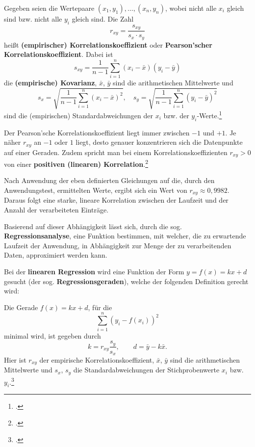 \flqq Gegeben seien die Wertepaare $(x_1,y_1), \dots,(x_n,y_n)$, wobei nicht alle $x_i$ gleich sind bzw. nicht alle $y_i$ gleich sind. Die Zahl
\begin{equation*}
r_{xy} = \frac{s_{xy}}{s_x \cdot s_y}
\end{equation*} 
heißt \textbf{(empirischer) Korrelationskoeffizient} oder \textbf{Pearson'scher Korrelationskoeffizient}. Dabei ist
\begin{equation*}
s_{xy} = \frac{1}{n-1} \displaystyle\sum_{i=1}^{n} (x_i - \bar{x})(y_i - \bar{y})
\end{equation*}
die \textbf{(empirische) Kovarianz}, $\bar{x}$, $\bar{y}$ sind die arithmetischen Mittelwerte und
\begin{equation*}
s_x = \sqrt{\frac{1}{n-1} \displaystyle\sum_{i=1}^{n} (x_i - \bar{x})^2}, \quad s_y = \sqrt{\frac{1}{n-1} \displaystyle\sum_{i=1}^{n} (y_i - \bar{y})^2}
\end{equation*}
sind die (empirischen) Standardabweichungen der $x_i$ bzw. der $y_i$-Werte.\frqq\footcite[S. 213]{Teschl.2014}

Der Pearson'sche Korrelationskoeffizient liegt immer zwischen $-1$ und $+1$. Je näher $r_{xy}$ an $-1$ oder $1$ liegt, desto genauer konzentrieren sich die Datenpunkte auf einer Geraden. Zudem spricht man bei einem Korrelationskoeffizienten $r_{xy}>0$ von einer \textbf{positiven (linearen) Korrelation}.\footcite[Vgl.][S. 214]{Teschl.2014}

Nach Anwendung der eben definierten Gleichungen auf die, durch den Anwendungstest, ermittelten Werte, ergibt sich ein Wert von $r_{xy} \approx 0,9982$. Daraus folgt eine starke, lineare Korrelation zwischen der Laufzeit und der Anzahl der verarbeiteten Einträge.

Basierend auf dieser Abhängigkeit lässt sich, durch die sog. \textbf{Regressionsanalyse}, eine Funktion bestimmen, mit welcher, die zu erwartende Laufzeit der Anwendung, in Abhängigkeit zur Menge der zu verarbeitenden Daten, approximiert werden kann.

Bei der \textbf{linearen Regression} wird eine Funktion der Form $y = f(x) = kx + d$ gesucht (der sog. \textbf{Regressionsgeraden}), welche der folgenden Definition gerecht wird:

\flqq Die Gerade $f(x) = kx + d$, für die
\begin{equation*}
\displaystyle\sum_{i=1}^{n} (y_i - f(x_i))^2
\end{equation*}
minimal wird, ist gegeben durch
\begin{equation*}
k = r_{xy} \frac{s_y}{s_x}, \quad \quad d = \bar{y} - k\bar{x}.
\end{equation*}
Hier ist $r_{xy}$ der empirische Korrelationskoeffizient, $\bar{x}$, $\bar{y}$ sind die arithmetischen Mittelwerte und $s_x$, $s_y$ die Standardabweichungen der Stichprobenwerte $x_i$ bzw. $y_i$.\frqq\footcite[216]{Teschl.2014}

